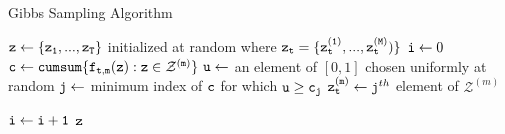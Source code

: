\documentclass{amsart}
\begin{document}
\begin{algorithm}
  \caption{Gibbs Sampling Algorithm\label{alg:gibbs}}
  \begin{algorithmic}[1]
    \State $\tt{z}\leftarrow \{z_1,...,z_T\}$ initialized at random where 
    $\tt{z}_t=\{z_t^{(1)},...,z_t^{(M)})\}$
    \State ${\tt i}\leftarrow 0$
        \State ${\tt c} \leftarrow {\tt cumsum \{f_{t,m}(z):z\in \mathcal 
        Z^{(m)}\}}$ 
        \label{eqn:alg_prob}
        \State ${\tt u}\leftarrow$ an element of $[0,1]$ chosen uniformly at 
        random
        \State ${\tt j}\leftarrow$ minimum index of ${\tt c}$ for which 
        $\tt{u}\geq c_j$
        \State ${\tt z_t^{(m)}}\leftarrow {\tt j}^{th}$ element of $\mathcal Z^{(m)}$

      \EndFor
      \State ${\tt i}\leftarrow {\tt i+1}$
      \EndWhile
      \State\Return ${\tt z}$
    \EndFunction
  \end{algorithmic}
\end{algorithm}



\end{document}
